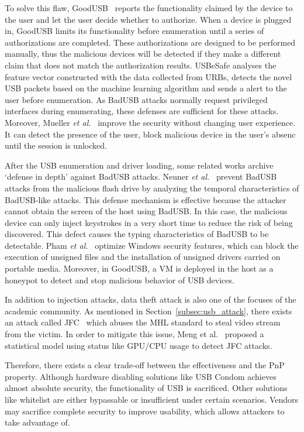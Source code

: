 To solve this flaw, GoodUSB~\cite{tian2015defending} reports the functionality claimed
by the device to the user and let the user decide whether to authorize. When a device
is plugged in, GoodUSB limits its functionality before enumeration until a
series of authorizations are completed. These authorizations are designed to be
performed manually, thus the malicious devices will be detected if they make a different claim 
that does not match the authorization results. 
USBeSafe\cite{usbesafe} analyses the 
feature vector constructed with the data collected from \acp{URB}, 
detects the novel \ac{USB} packets based on the machine learning algorithm and sends 
a alert to the user before enumeration. As BadUSB attacks normally request privileged 
interfaces during enumerating, these defenses are sufficient for these attacks.
Moreover, Mueller \emph{et al.}~\cite{MuellerZN19} improve the security without changing user experience. It can detect the presence of the user, block malicious device in the user's absenc until the session is unlocked.

After the \ac{USB} enumeration and driver loading, some related works
archive `defense in depth'
against BadUSB attacks.  Neuner \emph{et al.}~\cite{neuner2018usblock}
prevent BadUSB attacks from the malicious flash drive by analyzing
the temporal characteristics of BadUSB-like attacks. This defense mechanism is
effective because the attacker cannot obtain the screen of the host using
BadUSB. In this case, the malicious device can only inject keystrokes in a very
short time to reduce the risk of being discovered. This defect causes the
typing characteristics of BadUSB to be detectable. Pham \emph{et al.}~\cite{pham2010optimizing} optimize Windows security features, which can
block the execution of unsigned files and the installation of unsigned drivers
carried on portable media. Moreover, in GoodUSB, a VM is deployed in the host as
a honeypot to detect and stop malicious behavior of \ac{USB} devices.

In addition to injection attacks, data theft attack is also one of the focuses
of the academic community. As mentioned in Section~\ref{subsec:usb_attack}, there
exists an attack called JFC~\cite{JFC} which abuses the \ac{MHL}
standard to steal video stream from the victim. In order to mitigate this
issue, Meng et al.~\cite{meng2018252} proposed a statistical model using status
like GPU/CPU usage to detect JFC attacks.

Therefore, there exists a clear trade-off between the effectiveness and the
\ac{PnP} property. Although hardware disabling solutions like \ac{USB} Condom
achieves almost absolute security, the functionality of \ac{USB} is sacrificed.
Other solutions like whitelist are either bypassable or insufficient
under certain scenarios. Vendors may sacrifice complete security to
improve usability, which allows attackers to take advantage of.


